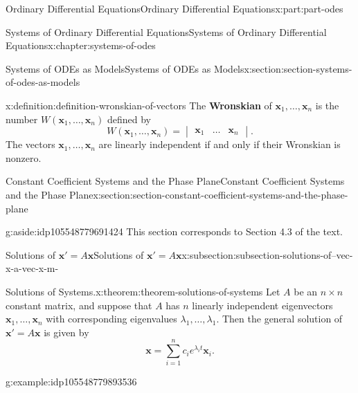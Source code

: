 \documentclass[oneside,10pt,]{book}
\newcommand{\terminology}[1]{\textbf{#1}}
\numberwithin{equation}{part}
\renewcommand{\vec}[1]{\mathbf{#1}}
\newcommand{\amp}{&}
\begin{document}
\begin{partptx}{Ordinary Differential Equations}{}{Ordinary Differential Equations}{}{}{x:part:part-odes}
\begin{chapterptx}{Systems of Ordinary Differential Equations}{}{Systems of Ordinary Differential Equations}{}{}{x:chapter:systems-of-odes}
\begin{sectionptx}{Systems of ODEs as Models}{}{Systems of ODEs as Models}{}{}{x:section:section-systems-of-odes-as-models}
\begin{definition}{}{x:definition:definition-wronskian-of-vectors}%
%
The \terminology{Wronskian} of \(\vec{x}_{1},\dots,\vec{x}_{n}\) is the number \(W(\vec{x}_{1},\dots,\vec{x}_{n})\) defined by%
\begin{equation*}
W(\vec{x}_{1},\dots,\vec{x}_{n}) = \begin{vmatrix}\vec{x}_{1}  \amp  \dots   \amp  \vec{x}_{n}\end{vmatrix}.
\end{equation*}
The vectors \(\vec{x}_{1},\dots,\vec{x}_{n}\) are linearly independent if and only if their Wronskian is nonzero.%
\end{definition}
\end{sectionptx}
%
%
\typeout{************************************************}
\typeout{************************************************}
%
\begin{sectionptx}{Constant Coefficient Systems and the Phase Plane}{}{Constant Coefficient Systems and the Phase Plane}{}{}{x:section:section-constant-coefficient-systems-and-the-phase-plane}
\begin{introduction}{}%
\begin{aside}{}{g:aside:idp105548779691424}%
This section corresponds to Section 4.3 of the text.%
\end{aside}
\end{introduction}%
%
%
\typeout{************************************************}
\typeout{Subsection  Solutions of \(\vec{x}' = A\vec{x}\)}
\typeout{************************************************}
%
\begin{subsectionptx}{Solutions of \(\vec{x}' = A\vec{x}\)}{}{Solutions of \(\vec{x}' = A\vec{x}\)}{}{}{x:subsection:subsection-solutions-of--vec-x-a-vec-x-m-}
\begin{theorem}{Solutions of Systems.}{}{x:theorem:theorem-solutions-of-systems}%
Let \(A\) be an \(n\times n\) constant matrix, and suppose that \(A\) has \(n\) linearly independent eigenvectors \(\vec{x}_{1},\dots,\vec{x}_{n}\) with corresponding eigenvalues \(\lambda_{1},\dots,\lambda_{1}\). Then the general solution of \(\vec{x}'=A\vec{x}\) is given by%
\begin{equation*}
\vec{x} = \sum_{i=1}^{n}c_{i}e^{\lambda_{i}t}\vec{x}_{i}.
\end{equation*}
%
\end{theorem}
\begin{example}{}{g:example:idp105548779893536}%

\end{example}
\end{subsectionptx}
\end{sectionptx}
\end{chapterptx}
\end{partptx}
\end{document}

